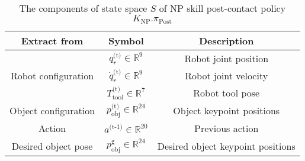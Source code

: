 
\begin{table}[ht]
\centering
\begin{tabular}{|c|c|c|}
\hline
\textbf{Extract from} & \textbf{Symbol} & \textbf{Description} \\
\hline
\multirow{3}{*}{Robot configuration}  & $q^\text{(t)}_r\in\mathbb{R}^9$ &Robot joint position   \\
\cline{2-3}
 & $\dot{q}^\text{(t)}_r\in\mathbb{R}^9$ &Robot joint velocity  \\
\cline{2-3}
 & $T^\text{(t)}_\text{tool}\in\mathbb{R}^7$& Robot tool pose \\
\cline{1-3}
 Object configuration& $p^\text{(t)}_\text{obj}\in\mathbb{R}^{24}$ &Object keypoint positions \\
\hline
Action & $a^\text{(t-1)}\in\mathbb{R}^{20}$ & Previous action  \\
\hline
Desired object pose & $p^\text{g}_\text{obj}\in\mathbb{R}^{24}$ &Desired object keypoint positions  \\
\hline
\end{tabular}
\caption{The components of state space $S$ of NP skill post-contact policy $K_\text{NP}.\pi_\text{Post}$}\label{table:NP_state}
\end{table}